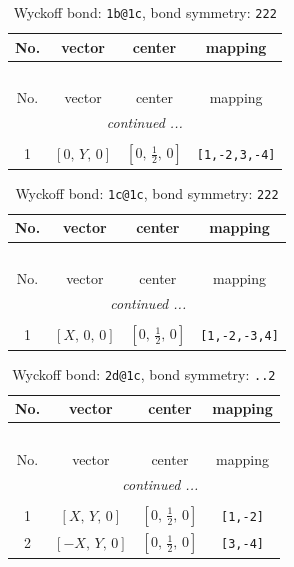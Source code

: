 \documentclass[fleqn,8pt]{jsarticle}
\begin{document}
\begin{longtable}{cccc}
\caption{Wyckoff bond: {\tt 1b@1c}, bond symmetry: {\tt 222}}
 \\
 \hline \hline
No. & vector & center & mapping \\ \hline \endfirsthead

\multicolumn{3}{l}{\tablename\ \thetable{}} \\
 \hline \hline
No. & vector & center & mapping \\ \hline \endhead

 \hline \hline
\multicolumn{3}{r}{\footnotesize\it continued ...} \\ \endfoot

 \hline \hline
\multicolumn{3}{r}{} \\ \endlastfoot

1 & $\left[ 0,\, Y,\, 0 \right]$ & $\left[ 0,\, \frac{1}{2},\, 0 \right]$ & {\tt [1,-2,3,-4]} \\
\end{longtable}
\renewcommand{\arraystretch}{1.2}
\begin{longtable}{cccc}
\caption{Wyckoff bond: {\tt 1c@1c}, bond symmetry: {\tt 222}}
 \\
 \hline \hline
No. & vector & center & mapping \\ \hline \endfirsthead

\multicolumn{3}{l}{\tablename\ \thetable{}} \\
 \hline \hline
No. & vector & center & mapping \\ \hline \endhead

 \hline \hline
\multicolumn{3}{r}{\footnotesize\it continued ...} \\ \endfoot

 \hline \hline
\multicolumn{3}{r}{} \\ \endlastfoot

1 & $\left[ X,\, 0,\, 0 \right]$ & $\left[ 0,\, \frac{1}{2},\, 0 \right]$ & {\tt [1,-2,-3,4]} \\
\end{longtable}
\renewcommand{\arraystretch}{1.2}
\begin{longtable}{cccc}
\caption{Wyckoff bond: {\tt 2d@1c}, bond symmetry: {\tt ..2}}
 \\
 \hline \hline
No. & vector & center & mapping \\ \hline \endfirsthead

\multicolumn{3}{l}{\tablename\ \thetable{}} \\
 \hline \hline
No. & vector & center & mapping \\ \hline \endhead

 \hline \hline
\multicolumn{3}{r}{\footnotesize\it continued ...} \\ \endfoot

 \hline \hline
\multicolumn{3}{r}{} \\ \endlastfoot

1 & $\left[ X,\, Y,\, 0 \right]$ & $\left[ 0,\, \frac{1}{2},\, 0 \right]$ & {\tt [1,-2]} \\ \hline
2 & $\left[ - X,\, Y,\, 0 \right]$ & $\left[ 0,\, \frac{1}{2},\, 0 \right]$ & {\tt [3,-4]} \\
\end{longtable}
\end{document}
